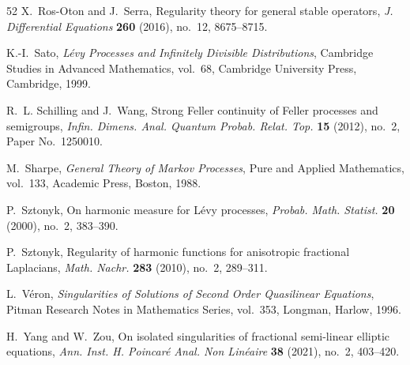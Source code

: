 \documentclass[11pt,a4paper,reqno]{amsart}
\theoremstyle{definition}
\numberwithin{equation}{section}
\begin{document}
\begin{thebibliography}{52}
X.~Ros-Oton and J.~Serra,
Regularity theory for general stable operators,
\emph{J. Differential Equations} \textbf{260} (2016), no.~12, 8675--8715.

K.-I.~Sato,
\emph{L\'evy Processes and Infinitely Divisible Distributions},
Cambridge Studies in Advanced Mathematics, vol.~68,
Cambridge University Press, Cambridge, 1999.

R.~L. Schilling and J.~Wang,
Strong Feller continuity of Feller processes and semigroups,
\emph{Infin. Dimens. Anal. Quantum Probab. Relat. Top.} \textbf{15} (2012), no.~2, Paper No.~1250010.

M.~Sharpe,
\emph{General Theory of Markov Processes},
Pure and Applied Mathematics, vol.~133,
Academic Press, Boston, 1988.

P.~Sztonyk,
On harmonic measure for L\'evy processes,
\emph{Probab. Math. Statist.} \textbf{20} (2000), no.~2, 383--390.

P.~Sztonyk,
Regularity of harmonic functions for anisotropic fractional Laplacians,
\emph{Math. Nachr.} \textbf{283} (2010), no.~2, 289--311.

L.~V\'eron,
\emph{Singularities of Solutions of Second Order Quasilinear Equations},
Pitman Research Notes in Mathematics Series, vol.~353,
Longman, Harlow, 1996.

H.~Yang and W.~Zou,
On isolated singularities of fractional semi-linear elliptic equations,
\emph{Ann. Inst. H. Poincar\'e Anal. Non Lin\'eaire} \textbf{38} (2021), no.~2, 403--420.

\end{thebibliography}
\end{document}
